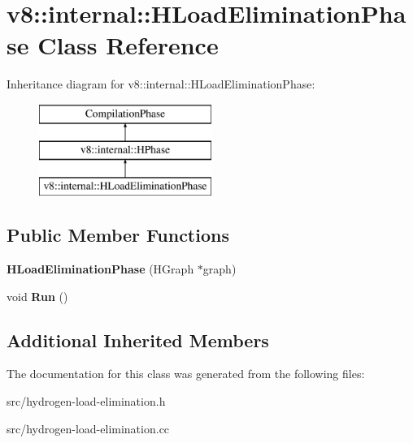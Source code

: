 \hypertarget{classv8_1_1internal_1_1_h_load_elimination_phase}{}\section{v8\+:\+:internal\+:\+:H\+Load\+Elimination\+Phase Class Reference}
\label{classv8_1_1internal_1_1_h_load_elimination_phase}
Inheritance diagram for v8\+:\+:internal\+:\+:H\+Load\+Elimination\+Phase\+:\begin{figure}[H]
\begin{center}
\leavevmode
\includegraphics[height=3.000000cm]{classv8_1_1internal_1_1_h_load_elimination_phase}
\end{center}
\end{figure}
\subsection*{Public Member Functions}
\begin{DoxyCompactItemize}
\item 
\hypertarget{classv8_1_1internal_1_1_h_load_elimination_phase_a8b62a7c5c626d0aa54eb59aa84eb1648}{}{\bfseries H\+Load\+Elimination\+Phase} (H\+Graph $\ast$graph)\label{classv8_1_1internal_1_1_h_load_elimination_phase_a8b62a7c5c626d0aa54eb59aa84eb1648}

\item 
\hypertarget{classv8_1_1internal_1_1_h_load_elimination_phase_a7502b30075f94dd27f53a399b6fc9416}{}void {\bfseries Run} ()\label{classv8_1_1internal_1_1_h_load_elimination_phase_a7502b30075f94dd27f53a399b6fc9416}

\end{DoxyCompactItemize}
\subsection*{Additional Inherited Members}


The documentation for this class was generated from the following files\+:\begin{DoxyCompactItemize}
\item 
src/hydrogen-\/load-\/elimination.\+h\item 
src/hydrogen-\/load-\/elimination.\+cc\end{DoxyCompactItemize}
